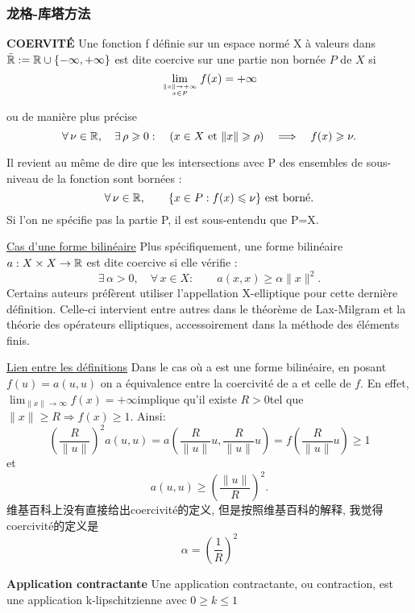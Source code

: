 \documentclass{article}
\begin{document}
\subsubsection{龙格-库塔方法}

\textbf{COERVIT\'E}
Une fonction f d\'efinie sur un espace norm\'e X \`a valeurs dans $ \bar{\mathbb{R}}:=\mathbb{R}\cup\{-\infty,+\infty\}$ est dite coercive sur une partie non born\'ee $ P$ de $X$ si
$$ \lim_{\mytop{\| x\| \to +\infty}{x\in P}}f(x)=+\infty $$

ou de mani\`ere plus pr\'ecise
$$
\forall\,\nu\in\mathbb{R},\quad \exists\,\rho\geqslant0:\quad (x\in X ~\mbox{et}~ \|x\|\geqslant\rho) \quad\Longrightarrow\quad f(x)\geqslant\nu.
$$

Il revient au m\^eme de dire que les intersections avec P des ensembles de sous-niveau de la fonction sont born\'ees :
$$
\forall\,\nu\in\mathbb{R},\qquad\{x\in P: f(x)\leqslant\nu\}~\mbox{est born\'e.}
$$
Si l'on ne sp\'ecifie pas la partie P, il est sous-entendu que P=X.

\underline{Cas d'une forme bilin\'eaire} \newline
Plus sp\'ecifiquement, une forme bilin\'eaire $a:X\times X\to\mathbb{R}$ est dite coercive si elle v\'erifie :
$$
\exists\,\alpha>0,\quad\forall\,x\in X:\qquad a(x,x) \geqslant \alpha\|x\|^2.
$$
Certains auteurs pr\'ef\`erent utiliser l'appellation X-elliptique pour cette derni\`ere d\'efinition. Celle-ci intervient entre autres dans le th\'eor\`eme de Lax-Milgram et la th\'eorie des op\'erateurs elliptiques, accessoirement dans la m\'ethode des \'el\'ements finis.

\underline{Lien entre les d\'efinitions}\newline
Dans le cas où a est une forme bilin\'eaire, en posant $f(u)=a(u,u)$ on a \'equivalence entre la coercivit\'e de a et celle de $f$. En effet, $\scriptstyle\lim_{\| x\|\to\infty}f(x)=+\infty $implique qu'il existe $R>0 $tel que $\scriptstyle\|x\|\geqslant R\Rightarrow f(x)\geqslant 1$. Ainsi:
$$
\left(\frac{R}{\|u\|}\right)^2a(u,u)=a\left(\frac{R}{\|u\|}u,\frac{R}{\|u\|}u\right)=f\left(\frac{R}{\|u\|}u\right)\geqslant 1
$$
et
$$
a(u,u)\geqslant\left(\frac{\|u\|}{R}\right)^2.
$$
维基百科上没有直接给出coercivit\'e的定义, 但是按照维基百科的解释, 我觉得coercivit\'e的定义是
$$
 \alpha=\left(\frac{1}{R}\right)^2
$$

\bigskip
\textbf{Application contractante}\newline
Une application contractante, ou contraction, est une application k-lipschitzienne avec $0 \geq k \le 1$
\bigskip
\end{document}
